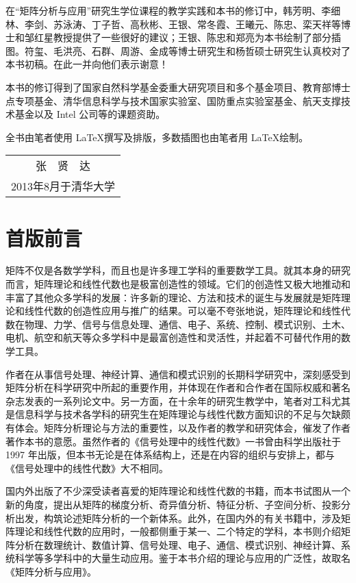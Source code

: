 \documentclass[punct=kaiming, fontset=fandol]{ctexbook}
\numberwithin{equation}{section}
\theoremstyle{mystyle}
\begin{document}
  在“矩阵分析与应用”研究生学位课程的教学实践和本书的修订中，韩芳明、李细林、李剑、苏泳涛、丁子哲、高秋彬、王银、常冬霞、王曦元、陈忠、栾天祥等博士和邹红星教授提供了一些很好的建议；王银、陈忠和郑亮为本书绘制了部分插图。符玺、毛洪亮、石群、周游、金成等博士研究生和杨哲硕士研究生认真校对了本书初稿。在此一并向他们表示谢意！

  本书的修订得到了国家自然科学基金委重大研究项目和多个基金项目、教育部博士点专项基金、清华信息科学与技术国家实验室、国防重点实验室基金、航天支撑技术基金以及 Intel 公司等的课题资助。

  全书由笔者使用 \LaTeX 撰写及排版，多数插图也由笔者用 \LaTeX 绘制。
  \begin{flushright}
    \fangsong
    \begin{tabular}{c@{}}
      张　贤　达\\
      {\small 2013年8月于清华大学}
    \end{tabular}\hspace*{2\ccwd}
  \end{flushright}

  \chapter{首版前言}
  矩阵不仅是各数学学科，而且也是许多理工学科的重要数学工具。就其本身的研究而言，矩阵理论和线性代数也是极富创造性的领域。它们的创造性又极大地推动和丰富了其他众多学科的发展：许多新的理论、方法和技术的诞生与发展就是矩阵理论和线性代数的创造性应用与推广的结果。可以毫不夸张地说，矩阵理论和线性代数在物理、力学、信号与信息处理、通信、电子、系统、控制、模式识别、土木、电机、航空和航天等众多学科中是最富创造性和灵活性，并起着不可替代作用的数学工具。

  作者在从事信号处理、神经计算、通信和模式识别的长期科学研究中，深刻感受到矩阵分析在科学研究中所起的重要作用，并体现在作者和合作者在国际权威和著名杂志发表的一系列论文中。另一方面，在十余年的研究生教学中，笔者对工科尤其是信息科学与技术各学科的研究生在矩阵理论与线性代数方面知识的不足与欠缺颇有体会。矩阵分析理论与方法的重要性，以及作者的教学和研究体会，催发了作者著作本书的意愿。虽然作者的《信号处理中的线性代数》一书曾由科学出版社于 1997 年出版，但本书无论是在体系结构上，还是在内容的组织与安排上，都与《信号处理中的线性代数》大不相同。

  国内外出版了不少深受读者喜爱的矩阵理论和线性代数的书籍，而本书试图从一个新的角度，提出从矩阵的梯度分析、奇异值分析、特征分析、子空间分析、投影分析出发，构筑论述矩阵分析的一个新体系。此外，在国内外的有关书籍中，涉及矩阵理论和线性代数的应用时，一般都侧重于某一、二个特定的学科，本书则介绍矩阵分析在数理统计、数值计算、信号处理、电子、通信、模式识别、神经计算、系统科学等多学科中的大量生动应用。鉴于本书介绍的理论与应用的广泛性，故取名《矩阵分析与应用》。
\end{document}
